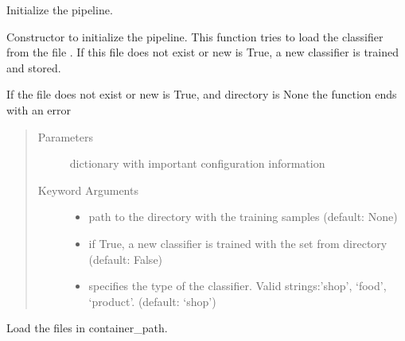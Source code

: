 \documentclass[letterpaper,10pt,english]{sphinxmanual}
\begin{document}
\begin{fulllineitems}
\begin{fulllineitems}
\end{fulllineitems}


\begin{fulllineitems}
\label{\detokenize{api:classifier.Classifier.__init__}}
Initialize the pipeline.

Constructor to initialize the pipeline. This function tries to load
the classifier from the file . If this file does
not exist or new is True, a new classifier is trained and stored.

If the file  does not exist or new is True, and
directory is None the function ends with an error
\begin{quote}\begin{description}
\item[{Parameters}] \leavevmode
{} \textendash{} dictionary with important configuration information

\item[{Keyword Arguments}] \leavevmode\begin{itemize}
\item {} 
 \textendash{} path to the directory with the training samples
(default: None)

\item {} 
 \textendash{} if True, a new classifier is trained with the set from
directory (default: False)

\item {} 
 \textendash{} specifies the type of the classifier. Valid strings:’shop’,
‘food’, ‘product’. (default: ‘shop’)

\end{itemize}

\end{description}\end{quote}

\end{fulllineitems}


\begin{fulllineitems}
\label{\detokenize{api:classifier.Classifier.load_files}}
Load the files in container\_path.


\end{fulllineitems}
\end{fulllineitems}
\end{document}
